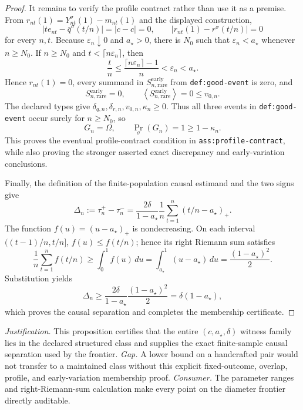 \documentclass{article}
\begin{document}
\begin{proof}
It remains to verify the profile contract rather than use it as a premise. From \(r_{nt}(1)=Y_{nt}^\sigma(1)-m_{nt}(1)\) and the displayed construction,
\[
 |t e_{nt}-\bar q^\sigma(t/n)|=|c-c|=0,
 \qquad
 |r_{nt}(1)-r^\sigma(t/n)|=0
\]
for every \(n,t\). Because \(\varepsilon_n\downarrow0\) and \(a_\star>0\), there is \(N_0\) such that \(\varepsilon_n<a_\star\) whenever \(n\ge N_0\). If \(n\ge N_0\) and \(t<\lceil n\varepsilon_n\rceil\), then
\[
 \frac tn\le \frac{\lceil n\varepsilon_n\rceil-1}{n}<\varepsilon_n<a_\star.
\]
Hence \(r_{nt}(1)=0\), every summand in \(S_{n,\mathrm{rare}}^{\mathrm{early}}\) from \texttt{def:good-event} is zero, and
\[
 S_{n,\mathrm{rare}}^{\mathrm{early}}=0,
 \qquad
 \left\langle S_{n,\mathrm{rare}}^{\mathrm{early}}\right\rangle=0\le v_{0,n}.
\]
The declared types give \(\delta_{q,n},\delta_{r,n},v_{0,n},\kappa_n\ge0\). Thus all three events in \texttt{def:good-event} occur surely for \(n\ge N_0\), so
\[
 G_n=\Omega,
 \qquad
 \Pr_\sigma(G_n)=1\ge1-\kappa_n.
\]
This proves the eventual profile-contract condition in \texttt{ass:profile-contract}, while also proving the stronger asserted exact discrepancy and early-variation conclusions.

Finally, the definition of the finite-population causal estimand and the two signs give
\[
 \Delta_n:=\tau_n^+-\tau_n^-
 =\frac{2\delta}{1-a_\star}\frac1n
   \sum_{t=1}^n(t/n-a_\star)_+.
\]
The function \(f(u)=(u-a_\star)_+\) is nondecreasing. On each interval \(((t-1)/n,t/n]\), \(f(u)\le f(t/n)\); hence its right Riemann sum satisfies
\[
 \frac1n\sum_{t=1}^n f(t/n)
 \ge \int_0^1 f(u)\,du
 =\int_{a_\star}^1(u-a_\star)\,du
 =\frac{(1-a_\star)^2}{2}.
\]
Substitution yields
\[
 \Delta_n\ge
 \frac{2\delta}{1-a_\star}\frac{(1-a_\star)^2}{2}
 =\delta(1-a_\star),
\]
which proves the causal separation and completes the membership certificate.
\end{proof}
\par\smallskip\noindent \textit{Justification.} This proposition certifies that the entire \((c,a_\star,\delta)\) witness family lies in the declared structured class and supplies the exact finite-sample causal separation used by the frontier. \textit{Gap.} A lower bound on a handcrafted pair would not transfer to a maintained class without this explicit fixed-outcome, overlap, profile, and early-variation membership proof. \textit{Consumer.} The parameter ranges and right-Riemann-sum calculation make every point on the diameter frontier directly auditable.
\end{document}
